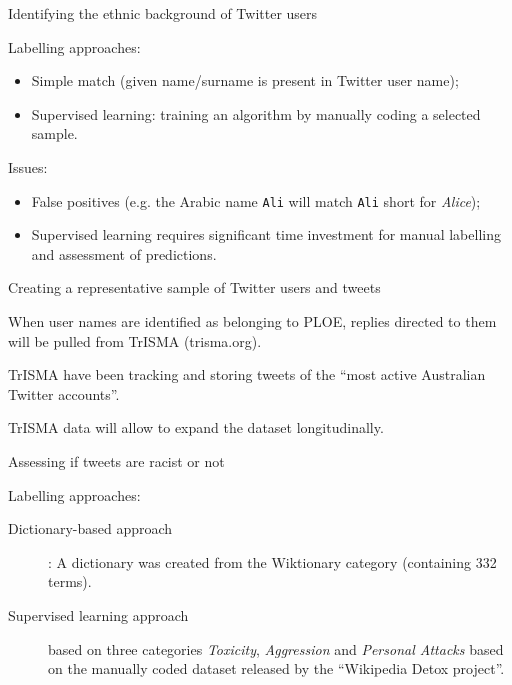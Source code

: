 \documentclass[serif, aspectratio=169]{beamer}
\begin{document}
\begin{frame}
{Identifying the ethnic background of Twitter users}

Labelling approaches:

\begin{itemize}

\item Simple match (given name/surname is present in Twitter user name);
\item Supervised learning: training an algorithm by manually coding a selected sample.

\end{itemize}

Issues:

\begin{itemize}

\item False positives (e.g. the Arabic name \texttt{Ali} will match \texttt{Ali} short for \textit{Alice});
\item Supervised learning requires significant time investment for manual labelling and assessment of predictions. 

\end{itemize}

\end{frame}

\begin{frame}
{Creating a representative sample of Twitter users and tweets}

When user names are identified as belonging to PLOE, replies directed to them will be pulled from TrISMA (trisma.org).

TrISMA have been tracking and storing tweets of the \enquote{most active Australian Twitter accounts}.

TrISMA data will allow to expand the dataset longitudinally. 

\end{frame}

\begin{frame}
{Assessing if tweets are racist or not}

Labelling approaches:

\begin{description}

\item[Dictionary-based approach]: A dictionary was created from the Wiktionary category  (containing 332 terms).

\item[Supervised learning approach] based on three categories \textit{Toxicity}, \textit{Aggression} and \textit{Personal Attacks} based on the manually coded dataset released by the \enquote{Wikipedia Detox project}.

\end{description}


\end{frame}
\end{document}
